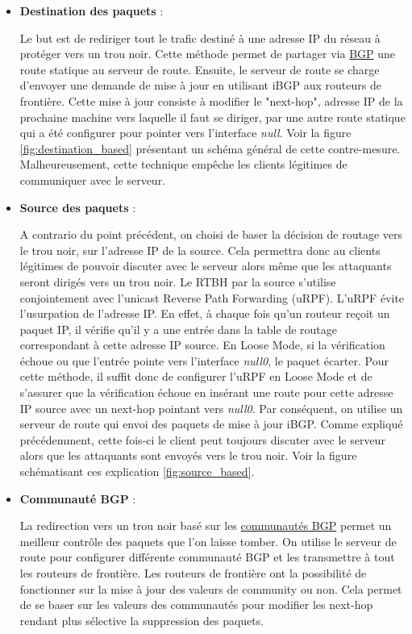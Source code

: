 \begin{itemize}
    \item \textbf{Destination des paquets} : 
    
    Le but est de rediriger tout le trafic destiné à une adresse IP du réseau à protéger vers un trou noir. Cette méthode permet de partager via \hyperref[sec:BGP]{BGP} une route statique au serveur de route. Ensuite, le serveur de route se charge d'envoyer une demande de mise à jour en utilisant iBGP aux routeurs de frontière. Cette mise à jour consiste à modifier le "next-hop", adresse IP de la prochaine machine vers laquelle il faut se diriger, par une autre route statique qui a été configurer pour pointer vers l'interface \textit{null}. Voir la figure \ref{fig:destination_based} présentant un schéma général de cette contre-mesure. Malheureusement, cette technique empêche les clients légitimes de communiquer avec le serveur.

    \item \textbf{Source des paquets} : 
    
    A contrario du point précédent, on choisi de baser la décision de routage vers le trou noir, sur l'adresse IP de la source. Cela permettra donc au clients légitimes de pouvoir discuter avec le serveur alors même que les attaquants seront dirigés vers un trou noir. Le RTBH par la source s'utilise conjointement avec l'unicast Reverse Path Forwarding (uRPF). L'uRPF évite l'usurpation de l'adresse IP. En effet, à chaque fois qu'un routeur reçoit un paquet IP, il vérifie qu'il y a une entrée dans la table de routage correspondant à cette adresse IP source. En Loose Mode, si la vérification échoue ou que l'entrée pointe vers l'interface \textit{null0}, le paquet écarter. Pour cette méthode, il suffit donc de configurer l'uRPF en Loose Mode et de s'assurer que la vérification échoue en insérant une route pour cette adresse IP source avec un next-hop pointant vers \textit{null0}. Par conséquent, on utilise un serveur de route qui envoi des paquets de mise à jour iBGP. Comme expliqué précédemment, cette fois-ci le client peut toujours discuter avec le serveur alors que les attaquants sont envoyés vers le trou noir. Voir la figure schématisant ces explication \ref{fig:source_based}.
    
    \item \textbf{Communauté BGP} : 
    
    La redirection vers un trou noir basé sur les \hyperref[sec:BGP]{communautés BGP} permet un meilleur contrôle des paquets que l'on laisse tomber. On utilise le serveur de route pour configurer différente communauté BGP et les transmettre à tout les routeurs de frontière. Les routeurs de frontière ont la possibilité de fonctionner sur la mise à jour des valeurs de community ou non. Cela permet de se baser sur les valeurs des communautés pour modifier les next-hop rendant plus sélective la suppression des paquets.
\end{itemize}

